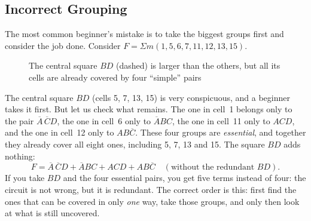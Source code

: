 \subsection{Incorrect Grouping}

The most common beginner's mistake is to take the biggest groups first and
consider the job done. Consider $F=\Sigma m(1,5,6,7,11,12,13,15)$.

\begin{figure}[H]
\centering
{}
\caption{The central square $BD$ (dashed) is larger than the others, but all its cells are already covered by four ``simple'' pairs}
\label{fig:karnaugh4_wrong}
\end{figure}

The central square $BD$ (cells 5, 7, 13, 15) is very conspicuous, and a
beginner takes it first. But let us check what remains. The one in cell~1
belongs only to the pair $\overline{A}\,\overline{C}D$, the one in cell~6
only to $\overline{A}BC$, the one in cell~11 only to $ACD$, and the one in
cell~12 only to $AB\overline{C}$. These four groups are \emph{essential}, and
together they already cover all eight ones, including 5, 7, 13 and 15. The
square $BD$ adds nothing:
\[
  F=\overline{A}\,\overline{C}D+\overline{A}BC+ACD+AB\overline{C}\quad
  (\text{without the redundant }BD).
\]
If you take $BD$ and the four essential pairs, you get five terms instead of
four: the circuit is not wrong, but it is redundant. The correct order is
this: first find the ones that can be covered in only \emph{one} way, take
those groups, and only then look at what is still uncovered.

